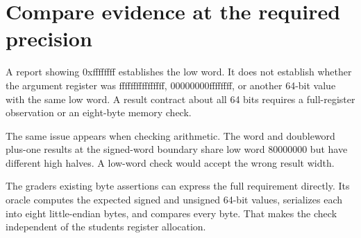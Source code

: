 \section{Compare evidence at the required
  precision}\label{004-bit-inspector-p09-compare-evidence-at-the-required-precision}

A report showing 0xffffffff establishes the low word. It does not
establish whether the argument register was ffffffffffffffff,
00000000ffffffff, or another 64-bit value with the same low word. A
result contract about all 64 bits requires a full-register observation
or an eight-byte memory check.

The same issue appears when checking arithmetic. The word and doubleword
plus-one results at the signed-word boundary share low word 80000000 but
have different high halves. A low-word check would accept the wrong
result width.

The grader\textquotesingle s existing byte assertions can express the
full requirement directly. Its oracle computes the expected signed and
unsigned 64-bit values, serializes each into eight little-endian bytes,
and compares every byte. That makes the check independent of the
student\textquotesingle s register allocation.
